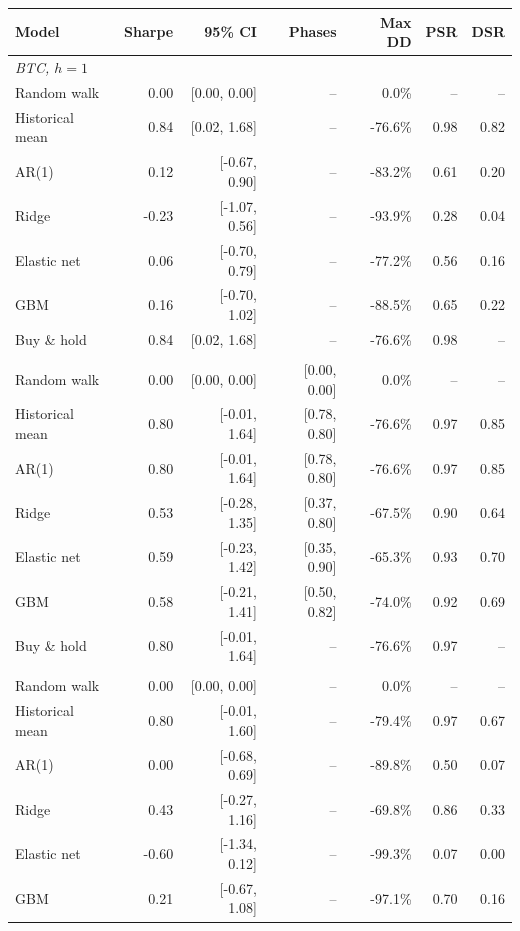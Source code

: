 \begin{tabular}{lrrrrrr}
\toprule
Model & Sharpe & 95\% CI & Phases & Max DD & PSR & DSR \\
\midrule
\multicolumn{7}{l}{\emph{BTC, $h=1$}} \\
\quad Random walk & 0.00 & [0.00, 0.00] & -- & 0.0\% & -- & -- \\
\quad Historical mean & 0.84 & [0.02, 1.68] & -- & -76.6\% & 0.98 & 0.82 \\
\quad AR(1) & 0.12 & [-0.67, 0.90] & -- & -83.2\% & 0.61 & 0.20 \\
\quad Ridge & -0.23 & [-1.07, 0.56] & -- & -93.9\% & 0.28 & 0.04 \\
\quad Elastic net & 0.06 & [-0.70, 0.79] & -- & -77.2\% & 0.56 & 0.16 \\
\quad GBM & 0.16 & [-0.70, 1.02] & -- & -88.5\% & 0.65 & 0.22 \\
\quad Buy \& hold & 0.84 & [0.02, 1.68] & -- & -76.6\% & 0.98 & -- \\
\addlinespace
\multicolumn{7}{l}{\emph{BTC, $h=7$}} \\
\quad Random walk & 0.00 & [0.00, 0.00] & [0.00, 0.00] & 0.0\% & -- & -- \\
\quad Historical mean & 0.80 & [-0.01, 1.64] & [0.78, 0.80] & -76.6\% & 0.97 & 0.85 \\
\quad AR(1) & 0.80 & [-0.01, 1.64] & [0.78, 0.80] & -76.6\% & 0.97 & 0.85 \\
\quad Ridge & 0.53 & [-0.28, 1.35] & [0.37, 0.80] & -67.5\% & 0.90 & 0.64 \\
\quad Elastic net & 0.59 & [-0.23, 1.42] & [0.35, 0.90] & -65.3\% & 0.93 & 0.70 \\
\quad GBM & 0.58 & [-0.21, 1.41] & [0.50, 0.82] & -74.0\% & 0.92 & 0.69 \\
\quad Buy \& hold & 0.80 & [-0.01, 1.64] & -- & -76.6\% & 0.97 & -- \\
\addlinespace
\multicolumn{7}{l}{\emph{ETH, $h=1$}} \\
\quad Random walk & 0.00 & [0.00, 0.00] & -- & 0.0\% & -- & -- \\
\quad Historical mean & 0.80 & [-0.01, 1.60] & -- & -79.4\% & 0.97 & 0.67 \\
\quad AR(1) & 0.00 & [-0.68, 0.69] & -- & -89.8\% & 0.50 & 0.07 \\
\quad Ridge & 0.43 & [-0.27, 1.16] & -- & -69.8\% & 0.86 & 0.33 \\
\quad Elastic net & -0.60 & [-1.34, 0.12] & -- & -99.3\% & 0.07 & 0.00 \\
\quad GBM & 0.21 & [-0.67, 1.08] & -- & -97.1\% & 0.70 & 0.16 \\

\end{tabular}
